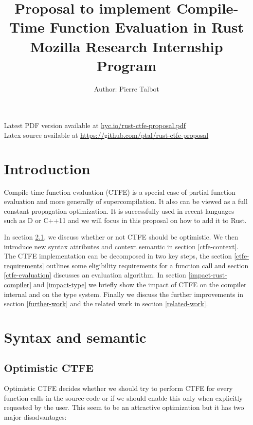 \documentclass[a4paper,11pt]{article}
\title{Proposal to implement Compile-Time Function Evaluation in Rust\\
\vspace{1em}
\large{Mozilla Research Internship Program}
}
\author{Author: Pierre Talbot}
\begin{document}
\maketitle
\begin{center}
Latest PDF version available at \url{hyc.io/rust-ctfe-proposal.pdf}\\
Latex source available at \url{https://github.com/ptal/rust-ctfe-proposal}
\end{center}
\abstract{}

\tableofcontents
\newpage
\section{Introduction}

Compile-time function evaluation (CTFE) is a special case of partial function evaluation\cite{PE} and more generally of supercompilation\cite{Turchin86theconcept}. It also can be viewed as a full constant propagation optimization. It is successfully used in recent languages such as D\cite{D_CTFE} or C++11\cite{DosReis:2010:GCE:1774088.1774537} and we will focus in this proposal on how to add it to Rust.

In section \ref{optimistic-ctfe}, we discuss whether or not CTFE should be optimistic. We then introduce new syntax attributes and context semantic in section \ref{ctfe-context}. The CTFE implementation can be decomposed in two key steps, the section \ref{ctfe-requirements} outlines some eligibility requirements for a function call and section \ref{ctfe-evaluation} discusses an evaluation algorithm. In section \ref{impact-rust-compiler} and \ref{impact-type} we briefly show the impact of CTFE on the compiler internal and on the type system. Finally we discuss the further improvements in section \ref{further-work} and the related work in section \ref{related-work}.

\section{Syntax and semantic}

\subsection{Optimistic CTFE}
\label{optimistic-ctfe}

Optimistic CTFE decides whether we should try to perform CTFE for every function calls in the source-code or if we should enable this only when explicitly requested by the user. This seem to be an attractive optimization but it has two major disadvantages:
\end{document}
